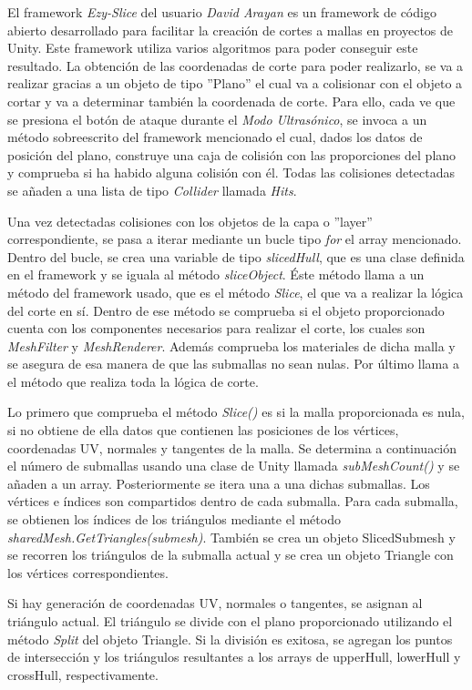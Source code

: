 El framework \textit{Ezy-Slice} del usuario \textit{David Arayan} es un framework de código abierto desarrollado para facilitar la creación de cortes a mallas en proyectos de Unity. Este framework utiliza varios algoritmos para poder conseguir este resultado. La obtención de las coordenadas de corte para poder realizarlo, se va a realizar gracias a un objeto de tipo ''Plano'' el cual va a colisionar con el objeto a cortar y va a determinar también la coordenada de corte. Para ello, cada ve que se presiona el botón de ataque durante el \textit{Modo Ultrasónico}, se invoca a un método sobreescrito del framework mencionado el cual, dados los datos de posición del plano, construye una caja de colisión con las proporciones del plano y comprueba si ha habido alguna colisión con él. Todas las colisiones detectadas se añaden a una lista de tipo \textit{Collider} llamada \textit{Hits}.

Una vez detectadas colisiones con los objetos de la capa o ''layer'' correspondiente, se pasa a iterar mediante un bucle tipo \textit{for} el array mencionado. Dentro del bucle, se crea una variable de tipo \textit{slicedHull}, que es una clase definida en el framework y se iguala al método \textit{sliceObject}. Éste método llama a un método del framework usado, que es el método \textit{Slice}, el que va a realizar la lógica del corte en sí. Dentro de ese método se comprueba si el objeto proporcionado cuenta con los componentes necesarios para realizar el corte, los cuales son \textit{MeshFilter} y \textit{MeshRenderer}. Además comprueba los materiales de dicha malla y se asegura de esa manera de que las submallas no sean nulas. Por último llama a el método que realiza toda la lógica de corte.

Lo primero que comprueba el método \textit{Slice()} es si la malla proporcionada es nula, si no obtiene de ella datos que contienen las posiciones de los vértices, coordenadas UV, normales y tangentes de la malla. Se determina a continuación el número  de submallas usando una clase de Unity llamada \textit{subMeshCount()} y se añaden a un array. Posteriormente se itera una a una dichas submallas. Los vértices e índices son compartidos dentro de cada submalla. Para cada submalla, se obtienen los índices de los triángulos mediante el método \textit{sharedMesh.GetTriangles(submesh)}. También se crea un objeto SlicedSubmesh y se recorren los triángulos de la submalla actual y se crea un objeto Triangle con los vértices correspondientes.

Si hay generación de coordenadas UV, normales o tangentes, se asignan al triángulo actual. El triángulo se divide con el plano proporcionado utilizando el método \textit{Split} del objeto Triangle. Si la división es exitosa, se agregan los puntos de intersección y los triángulos resultantes a los arrays de upperHull, lowerHull y crossHull, respectivamente.

